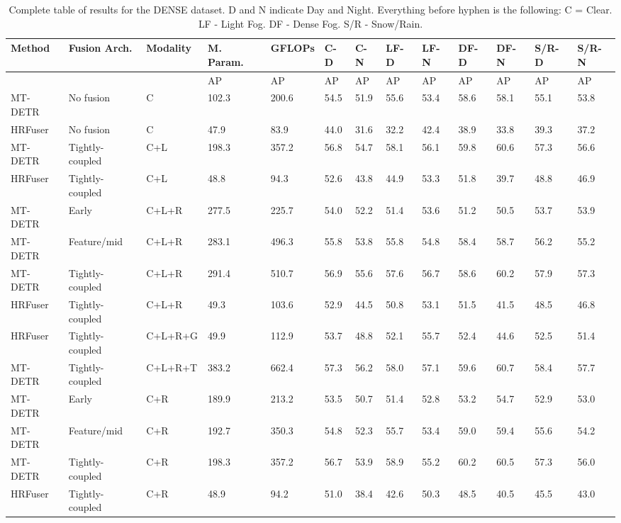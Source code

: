 \documentclass[report.tex]{subfiles}
\begin{document}
    \begin{sidewaystable}
        \centering
        \caption{Complete table of results for the DENSE dataset. D and N indicate Day and Night. Everything before hyphen is the following: C = Clear. LF - Light Fog. DF - Dense Fog. S/R - Snow/Rain.}
        \label{tab:complete_results_table}
        \begin{tabular}{@{}lllllllllllll@{}}
        \toprule
        Method    & Fusion Arch.   & Modality & M. Param. & GFLOPs & C-D & C-N & LF-D & LF-N & DF-D & DF-N & S/R-D & S/R-N \\ \midrule
                  &                &          & AP        & AP     & AP  & AP  & AP   & AP   & AP   & AP   & AP    & AP    \\
        MT-DETR   & No fusion      & C        & 102.3     & 200.6  & 54.5 & 51.9 & 55.6 & 53.4 & 58.6 & 58.1 & 55.1  & 53.8  \\
        HRFuser   & No fusion      & C        & 47.9      & 83.9  & 44.0 & 31.6 & 32.2 & 42.4 & 38.9 & 33.8 & 39.3  & 37.2  \\
        MT-DETR   & Tightly-coupled & C+L      & 198.3     & 357.2  & 56.8 & 54.7 & 58.1 & 56.1 & 59.8 & 60.6 & 57.3  & 56.6  \\
        HRFuser   & Tightly-coupled & C+L      & 48.8      & 94.3  & 52.6 & 43.8 & 44.9 & 53.3 & 51.8 & 39.7 & 48.8  & 46.9  \\
        MT-DETR   & Early          & C+L+R    & 277.5     & 225.7  & 54.0 & 52.2 & 51.4 & 53.6 & 51.2 & 50.5 & 53.7  & 53.9  \\
        MT-DETR   & Feature/mid    & C+L+R    & 283.1     & 496.3  & 55.8 & 53.8 & 55.8 & 54.8 & 58.4 & 58.7 & 56.2  & 55.2  \\
        MT-DETR   & Tightly-coupled & C+L+R    & 291.4     & 510.7  & 56.9 & 55.6 & 57.6 & 56.7 & 58.6 & 60.2 & 57.9  & 57.3  \\
        HRFuser   & Tightly-coupled & C+L+R    & 49.3      & 103.6 & 52.9 & 44.5 & 50.8 & 53.1 & 51.5 & 41.5 & 48.5  & 46.8  \\
        HRFuser   & Tightly-coupled & C+L+R+G  & 49.9      & 112.9  & 53.7 & 48.8 & 52.1 & 55.7 & 52.4 & 44.6 & 52.5  & 51.4  \\
        MT-DETR   & Tightly-coupled & C+L+R+T  & 383.2     & 662.4  & 57.3 & 56.2 & 58.0 & 57.1 & 59.6 & 60.7 & 58.4  & 57.7  \\
        MT-DETR   & Early          & C+R      & 189.9     & 213.2  & 53.5 & 50.7 & 51.4 & 52.8 & 53.2 & 54.7 & 52.9  & 53.0  \\
        MT-DETR   & Feature/mid    & C+R      & 192.7     & 350.3  & 54.8 & 52.3 & 55.7 & 53.4 & 59.0 & 59.4 & 55.6  & 54.2  \\
        MT-DETR   & Tightly-coupled & C+R      & 198.3     & 357.2  & 56.7 & 53.9 & 58.9 & 55.2 & 60.2 & 60.5 & 57.3  & 56.0  \\
        HRFuser   & Tightly-coupled & C+R      & 48.9      & 94.2  & 51.0 & 38.4 & 42.6 & 50.3 & 48.5 & 40.5 & 45.5  & 43.0  \\ \bottomrule
        \end{tabular}
        \end{sidewaystable}


    
\end{document}
